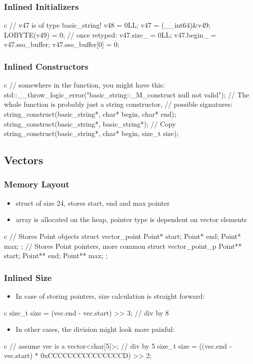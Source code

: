 \documentclass[aspectratio=169]{beamer}
\begin{document}
{\begin{frame}[fragile]
    \frametitle{Inlined Initializers}
\begin{codebox}{c}
// v47 is of type basic_string!
v48 = 0LL;
v47 = (__int64)&v49;
LOBYTE(v49) = 0;
// once retyped:
v47.size_ = 0LL;
v47.begin_ = v47.sso_buffer;
v47.sso_buffer[0] = 0;
\end{codebox}

\end{frame}

\begin{frame}[fragile]
    \frametitle{Inlined Constructors}
\begin{codebox}{c}
// somewhere in the function, you might have this:
std::__throw_logic_error("basic_string::_M_construct null not valid");
// The whole function is probably just a string constructor,
// possible signatures:
string_construct(basic_string*, char* begin, char* end);
string_construct(basic_string*, basic_string*); // Copy
string_construct(basic_string*, char* begin, size_t size);
\end{codebox}
\end{frame}

\subsection{Vectors}
\begin{frame}[fragile]
    \frametitle{Memory Layout}
    \begin{itemize}
        \item struct of size 24, stores start, end and max pointer
        \item array is allocated on the heap, pointer type is dependent on vector elements
    \end{itemize}
\begin{codebox}{c}
// Stores Point objects
struct vector_point
{
    Point* start;
    Point* end;
    Point* max;
};
// Stores Point pointers, more common
struct vector_point_p
{
    Point** start;
    Point** end;
    Point** max;
};
\end{codebox}
\end{frame}

\begin{frame}[fragile]
    \frametitle{Inlined Size}
\begin{itemize}
    \item In case of storing pointers, size calculation is straight forward:
\end{itemize}
\begin{codebox}{c}
size_t size = (vec.end - vec.start) >> 3; // div by 8
\end{codebox}
\begin{itemize}
    \item In other cases, the division might look more painful:
\end{itemize}
\begin{codebox}{c}
// assume vec is a vector<char[5]>;
// div by 5
size_t size = ((vec.end - vec.start) * 0xCCCCCCCCCCCCCCCD) >> 2;
\end{codebox}
\end{frame}

}
\end{document}
